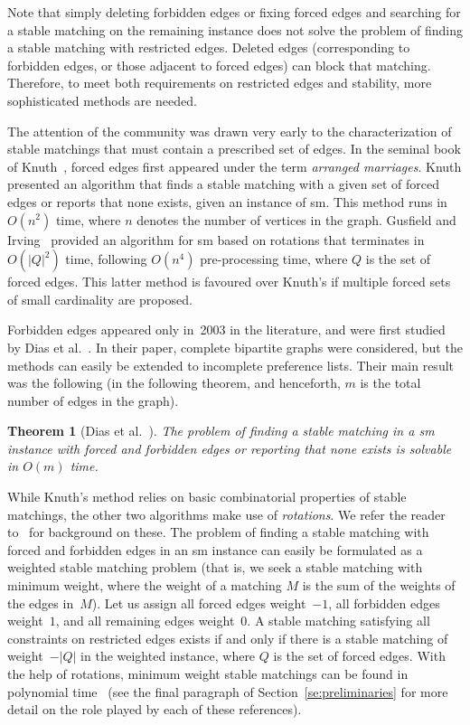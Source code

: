 \documentclass[preprint,12pt]{elsarticle}
\newtheorem{theorem}{Theorem}[section]
\begin{document}
Note that simply deleting forbidden edges or fixing forced edges and searching for a stable matching on the remaining instance does not solve the problem of finding a stable matching with restricted edges. Deleted edges (corresponding to forbidden edges, or those adjacent to forced edges) can block that matching. Therefore, to meet both requirements on restricted edges and stability, more sophisticated methods are needed.

The attention of the community was drawn very early to the characterization of stable matchings that must contain a prescribed set of edges. In the seminal book of Knuth~\cite{Knu76}, forced edges first appeared under the term \emph{arranged marriages}. Knuth presented an algorithm that finds a stable matching with a given set of forced edges or reports that none exists, given an instance of {\sc sm}. This method runs in $O(n^2)$ time, where $n$ denotes the number of vertices in the graph. Gusfield and Irving~\cite{GI89} provided an algorithm for {\sc sm} based on rotations that terminates in $O(|Q|^2)$ time, following $O(n^4)$ pre-processing time, where $Q$ is the set of forced edges. This latter method is favoured over Knuth's if multiple forced sets of small cardinality are proposed.

Forbidden edges appeared only in~2003 in the literature, and were first studied by Dias et al.~\cite{DFFS03}. In their paper, complete bipartite graphs were considered, but the methods can easily be extended to incomplete preference lists. Their main result was the following (in the following theorem, and henceforth, $m$ is the total number of edges in the graph).

\begin{theorem}[Dias et al.~\cite{DFFS03}] 
\label{th:bip_decision} 
The problem of finding a stable matching in a  {\sc sm} instance with forced and forbidden edges or reporting that none exists is solvable in $O(m)$ time.
\end{theorem}

While Knuth's method relies on basic combinatorial properties of stable matchings, the other two algorithms make use of \emph{rotations}. We refer the reader to~\cite{GI89} for background on these. The problem of finding a stable matching with forced and forbidden edges in an {\sc sm} instance can easily be formulated as a weighted stable matching problem (that is, we seek a stable matching with minimum weight, where the weight of a matching $M$ is the sum of the weights of the edges in~$M$). Let us assign all forced edges weight~$-1$, all forbidden edges weight~$1$, and all remaining edges weight~0. A stable matching satisfying all constraints on restricted edges exists if and only if there is a stable matching of weight~$-|Q|$ in the weighted instance, where $Q$ is the set of forced edges. With the help of rotations, minimum weight stable matchings can be found in polynomial time~\cite{ILG87,Fed92,Rot92,Fed94} (see the final paragraph of Section~\ref{se:preliminaries} for more detail on the role played by each of these references).
\end{document}
